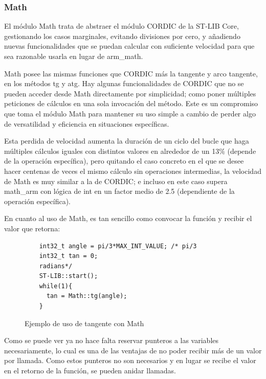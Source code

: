 \documentclass{report}
\begin{document}
\subsubsection{Math}
El módulo Math trata de abstraer el módulo CORDIC de la ST-LIB Core, gestionando los casos marginales, evitando divisiones por cero, y añadiendo nuevas funcionalidades que se puedan calcular con suficiente velocidad para que sea razonable usarla en lugar de arm\_math. \par \vspace{0.3cm}
Math posee las mismas funciones que CORDIC más la tangente y arco tangente, en los métodos tg y atg. Hay algunas funcionalidades de CORDIC que no se pueden acceder desde Math directamente por simplicidad; como poner múltiples peticiones de cálculos en una sola invocación del método. Este es un compromiso que toma el módulo Math para mantener su uso simple a cambio de perder algo de versatilidad y eficiencia en situaciones específicas. \par \vspace{0.3cm}
Esta perdida de velocidad aumenta la duración de un ciclo del bucle que haga múltiples cálculos iguales con distintos valores en alrededor de un 13\% (depende de la operación específica), pero quitando el caso concreto en el que se desee hacer centenas de veces el mismo cálculo sin operaciones intermedias, la velocidad de Math es muy similar a la de CORDIC; e incluso en este caso supera math\_arm con lógica de int en un factor medio de 2.5 (dependiente de la operación específica).
\par \vspace{0.3cm}
En cuanto al uso de Math, es tan sencillo como convocar la función y recibir el valor que retorna: 
\begin{figure}[h]
  \begin{lstlisting}
    int32_t angle = pi/3*MAX_INT_VALUE; /* pi/3 
    int32_t tan = 0;
    radians*/
    ST-LIB::start();
    while(1){
      tan = Math::tg(angle);
    }
  \end{lstlisting}
  \caption{Ejemplo de uso de tangente con Math}
  \label{MathCode}
\end{figure}
\par \vspace{0.3cm}
Como se puede ver ya no hace falta reservar punteros a las variables necesariamente, lo cual es una de las ventajas de no poder recibir más de un valor por llamada. Como estos punteros no son necesarios y en lugar se recibe el valor en el retorno de la función, se pueden anidar llamadas. 
\end{document}

